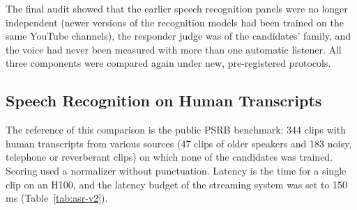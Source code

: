 The final audit showed that the earlier speech recognition panels were no longer
independent (newer versions of the recognition models had been trained on the same
YouTube channels), the responder judge was of the candidates' family, and the voice had
never been measured with more than one automatic listener. All three components were
compared again under new, pre-registered protocols.

\subsection{Speech Recognition on Human Transcripts}

The reference of this comparison is the public PSRB benchmark: 344 clips with human
transcripts from various sources (47 clips of older speakers and 183 noisy, telephone or
reverberant clips) on which none of the candidates was trained. Scoring used a
normalizer without punctuation. Latency is the time for a single clip on an H100, and the
latency budget of the streaming system was set to 150 ms (Table~\ref{tab:asr-v2}).

